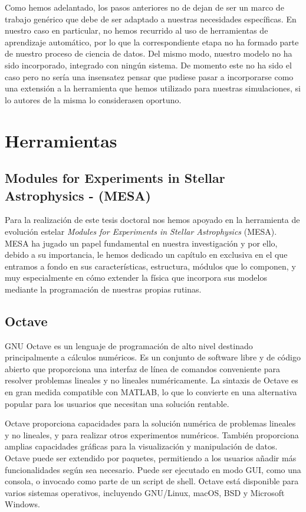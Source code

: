 Como hemos adelantado, los pasos anteriores no de dejan de ser un marco de trabajo genérico que debe de ser adaptado a nuestras necesidades específicas. En nuestro caso en particular, no hemos recurrido al uso de herramientas de aprendizaje automático, por lo que la correspondiente etapa no ha formado parte de nuestro proceso de ciencia de datos. Del mismo modo, nuestro modelo no ha sido incorporado, integrado con ningún sistema. De momento este no ha sido el caso pero no sería una insensatez pensar que pudiese pasar a incorporarse como una extensión a la herramienta que hemos utilizado para nuestras simulaciones, si lo autores de la misma lo considerasen oportuno.

\section{Herramientas}
\subsection{Modules for Experiments in Stellar Astrophysics - (MESA)}
Para la realización de este tesis doctoral nos hemos apoyado en la herramienta de evolución estelar \textit{Modules for Experiments in Stellar Astrophysics} (MESA). MESA ha jugado un papel fundamental en nuestra investigación y por ello, debido a su importancia, le hemos dedicado un capítulo en exclusiva en el que entramos a fondo en sus características, estructura, módulos que lo componen, y muy especialmente en cómo extender la física que incorpora sus modelos mediante la programación de nuestras propias rutinas.\par


\subsection{Octave} \label{sec:tool_octave}
GNU Octave es un lenguaje de programación de alto nivel destinado principalmente a cálculos numéricos. Es un conjunto de software libre y de código abierto que proporciona una interfaz de línea de comandos conveniente para resolver problemas lineales y no lineales numéricamente. La sintaxis de Octave es en gran medida compatible con MATLAB, lo que lo convierte en una alternativa popular para los usuarios que necesitan una solución rentable. 

Octave proporciona capacidades para la solución numérica de problemas lineales y no lineales, y para realizar otros experimentos numéricos. También proporciona amplias capacidades gráficas para la visualización y manipulación de datos. Octave puede ser extendido por paquetes, permitiendo a los usuarios añadir más funcionalidades según sea necesario. Puede ser ejecutado en modo GUI, como una consola, o invocado como parte de un script de shell. Octave está disponible para varios sistemas operativos, incluyendo GNU/Linux, macOS, BSD y Microsoft Windows.

